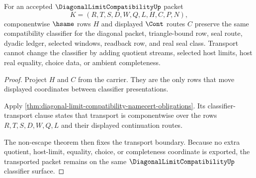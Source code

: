 

\begin{theorem}
\label{thm:diagonal-limit-compatibility-classifier-transport}
For an accepted $\DiagonalLimitCompatibilityUp$ packet
$$
K=(R,T,S,D,W,Q,L,H,C,P,N),
$$
componentwise $\hsame$ rows $H$ and displayed $\Cont$ routes $C$ preserve the same compatibility classifier for the diagonal packet, triangle-bound row, seal route, dyadic ledger, selected windows, readback row, and real seal class. Transport cannot change the classifier by adding quotient streams, selected host limits, host real equality, choice data, or ambient completeness.
\end{theorem}
\begin{proof}
Project $H$ and $C$ from the carrier. They are the only rows that move displayed coordinates between classifier presentations.

Apply \autoref{thm:diagonal-limit-compatibility-namecert-obligations}. Its classifier-transport clause states that transport is componentwise over the rows $R,T,S,D,W,Q,L$ and their displayed continuation routes.

The non-escape theorem then fixes the transport boundary. Because no extra quotient, host-limit, equality, choice, or completeness coordinate is exported, the transported packet remains on the same $\DiagonalLimitCompatibilityUp$ classifier surface.
\end{proof}

